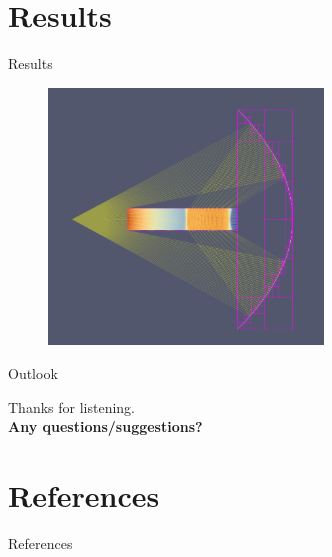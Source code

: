 \documentclass[aspectratio=43,t]{beamer}
\begin{document}
	\section{Results}
	\begin{frame}[fragile]{Results}
		\begin{figure}
		\centering
		\includegraphics[width=0.65\textwidth]{images/result.png}
		\end{figure}
    \end{frame}

	\begin{frame}[fragile]{Outlook}
    \end{frame}

  { %
    \begin{frame}[c,noframenumbering]
      \begin{center}
        Thanks for listening.\\
        {\bf Any questions/suggestions?}
      \end{center}
    \end{frame}

    \section*{References}
    \begin{frame}{References}
      \printbibliography
    \end{frame}
  }
	
\end{document}
